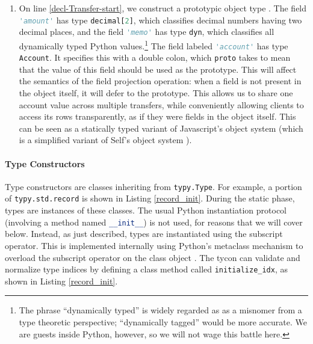 \documentclass{sigplanconf}
\newcommand{\lip}[1]{\lstinline[language=Python,basicstyle=\ttfamily\small,deletendkeywords={tuple,buffer,map}]{#1}}
\begin{document}
\begin{enumerate}
\item On line \ref{decl-Transfer-start}, we construct a prototypic object type \cite{Lie86}. The field \lip{'amount'} has type \lip{decimal[2]}, which classifies decimal numbers having two decimal places, and the field \lip{'memo'} has type \lip{dyn}, which classifies all dynamically typed Python values.\footnote{The phrase ``dynamically typed'' is widely regarded as as a misnomer from a type theoretic perspective; ``dynamically tagged'' would be more accurate. We are guests inside Python, however, so we will not wage this battle here.} The field labeled \lip{'account'} has type \lip{Account}. It specifies this with a double colon, which \lip{proto} takes to mean that the value of this field should be used as the prototype. This will affect the semantics of the field projection operation: when a field is not present in the object itself, it will defer to the prototype. This allows us to  share one account value across multiple transfers, while conveniently allowing clients to access its rows transparently, as if they were fields in the object itself. This can be seen as a statically typed variant of Javascript's object system (which is a simplified variant of Self's object system \cite{Ungar:Smith:oopsla:1987}). %
\end{enumerate}



\paragraph{Type Constructors} Type constructors are classes inheriting from \lip{typy.Type}. For example, a portion of \lip{typy.std.record} is shown in Listing \ref{record_init}. During the static phase, types are instances of these classes. The usual Python instantiation protocol (involving a method named \lip{__init__}) is not used, for reasons that we will cover below. Instead, as just described, types are instantiated using the subscript operator. This is implemented internally using Python's metaclass mechanism to overload the subscript operator on the class object \cite{python}. The tycon can validate and normalize  type indices by defining a class method called \lip{initialize_idx}, as shown in Listing \ref{record_init}. %
\end{document}
